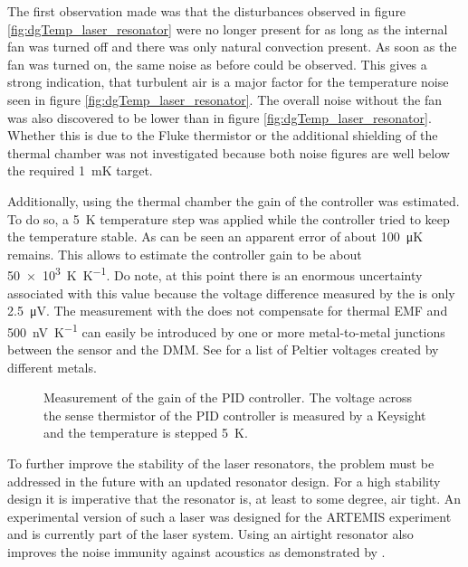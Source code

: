 The first observation made was that the disturbances observed in figure \ref{fig:dgTemp_laser_resonator} were no longer present for as long as the internal fan was turned off and there was only natural convection present. As soon as the fan was turned on, the same noise as before could be observed. This gives a strong indication, that turbulent air is a major factor for the temperature noise seen in figure \ref{fig:dgTemp_laser_resonator}. The overall noise without the fan was also discovered to be lower than in figure \ref{fig:dgTemp_laser_resonator}. Whether this is due to the Fluke  thermistor or the additional shielding of the thermal chamber was not investigated because both noise figures are well below the required \qty{1}{\milli\kelvin} target.

Additionally, using the thermal chamber the gain of the controller was estimated. To do so, a \qty{5}{\K} temperature step was applied while the controller tried to keep the temperature stable. As can be seen an apparent error of about \qty{100}{\micro \K} remains. This allows to estimate the controller gain to be about \qty{50e3}{\K \per \K}. Do note, at this point there is an enormous uncertainty associated with this value because the voltage difference measured by the  is only \qty{2.5}{\uV}. The measurement with the  does not compensate for thermal EMF and \qty{500}{\nV \per \K} can easily be introduced by one or more metal-to-metal junctions between the sensor and the DMM. See \cite{horowitz1989} for a list of Peltier voltages created by different metals.
\begin{figure}[ht]
    \centering
    \caption{Measurement of the gain of the PID controller. The voltage across the sense thermistor of the PID controller is measured by a Keysight  and the temperature is stepped \qty{5}{\K}.}
    \label{fig:dgTemp_testmass}
\end{figure}

To further improve the stability of the laser resonators, the problem must be addressed in the future with an updated resonator design. For a high stability design it is imperative that the resonator is, at least to some degree, air tight. An experimental version of such a laser was designed for the ARTEMIS experiment \cite{two_filter_paper} and is currently part of the laser system. Using an airtight resonator also improves the noise immunity against acoustics as demonstrated by \citeauthor{ecdl_silicone_housing} \cite{ecdl_silicone_housing}.

